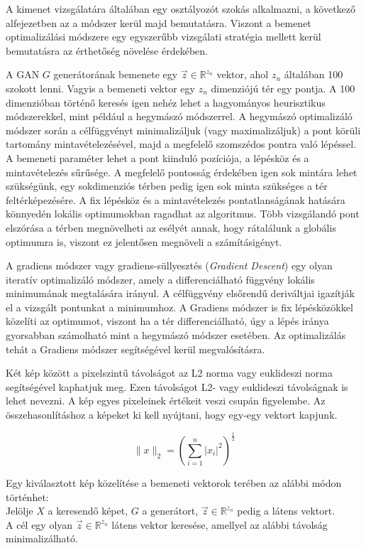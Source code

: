 A kimenet vizsgálatára általában egy osztályozót szokás alkalmazni, a következő alfejezetben az a módszer kerül majd bemutatásra. Viszont a bemenet optimalizálási módszere egy egyszerűbb vizsgálati stratégia mellett kerül bemutatásra az érthetőség növelése érdekében.

A GAN $G$ generátorának bemenete egy $\vec{z} \in \mathbb{R}^{z_n}$ vektor, ahol $z_n$ általában 100 szokott lenni. Vagyis a bemeneti vektor egy $z_n$ dimenziójú tér egy pontja. A 100 dimenzióban történő keresés igen nehéz lehet a hagyományos heurisztikus módszerekkel, mint például a hegymászó módszerrel. A hegymászó optimalizáló módszer során a célfüggvényt minimalizáljuk (vagy maximalizáljuk) a pont körüli tartomány mintavételezésével, majd a megfelelő szomszédos pontra való lépéssel. A bemeneti paraméter lehet a pont kiinduló pozíciója, a lépésköz és a mintavételezés sűrűsége. A megfelelő pontosság érdekében igen sok mintára lehet szükségünk, egy sokdimenziós térben pedig igen sok minta szükséges a tér feltérképezésére. A fix lépésköz és a mintavételezés pontatlanságának hatására könnyedén lokális optimumokban ragadhat az algoritmus. Több vizsgálandó pont elszórása a térben megnövelheti az esélyét annak, hogy rátalálunk a globális optimumra is, viszont ez jelentősen megnöveli a számításigényt.

A gradiens módszer vagy gradiens-süllyesztés (\textit{Gradient Descent}) egy olyan iteratív optimalizáló módszer, amely a differenciálható függvény lokális minimumának megtalására irányul. A célfüggvény elsőrendű deriváltjai igazítják el a vizsgált pontunkat a minimumhoz. \cite{ruder2016overview} A Gradiens módszer is fix lépésközökkel közelíti az optimumot, viszont ha a tér differenciálható, úgy a lépés iránya gyorsabban számolható mint a hegymászó módszer esetében. Az optimalizálás tehát a Gradiens módszer segítségével kerül megvalósításra.

Két kép között a pixelszintű távolságot az L2 norma vagy euklideszi norma segítségével kaphatjuk meg. Ezen távolságot L2- vagy euklideszi távolságnak is lehet nevezni. A kép egyes pixeleinek értékeit veszi csupán figyelembe. Az összehasonlításhoz a képeket ki kell nyújtani, hogy egy-egy vektort kapjunk.

$$ \|x\|_2 = \left({\sum_{i=1}^{n}|x_i|^2}\right)^{\frac{1}{2}} $$

Egy kiválasztott kép közelítése a bemeneti vektorok terében az alábbi módon történhet:\\ 
Jelölje $X$ a keresendő képet, $G$ a generátort, $\vec{z} \in \mathbb{R}^{z_n}$ pedig a látens vektort.\\
A cél egy olyan $\vec{z} \in \mathbb{R}^{z_n}$ látens vektor keresése, amellyel az alábbi távolság minimalizálható.

